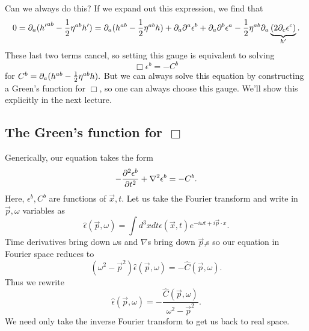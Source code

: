Can we always do this? If we expand out this expression, we find that
$$0=\partial_a({h'}^{ab}-\frac{1}{2}\eta^{ab}h')=\partial_a(h^{ab}-\frac{1}{2}\eta^{ab}h)+\partial_a \partial^a \epsilon^b +\partial_a \partial^b \epsilon^a -\frac{1}{2} \eta^{ab} \partial_a \underbrace{(2\partial_c \epsilon^c)}_{h'}.$$
These last two terms cancel, so setting this gauge is equivalent to solving
$$\Box \epsilon^b = -C^b$$ for
$C^b=\partial_a(h^{ab}-\frac{1}{2}\eta^{ab}h).$
But we can always solve this equation by constructing a Green's function for $\Box$, so one can always choose this gauge. We'll show this explicitly in the next lecture.

\subsection*{The Green's function for $\Box$} Generically, our equation takes the form
$$-\frac{\partial^2 \epsilon^b}{\partial t^2}+\nabla^2 \epsilon^b =-C^b.$$
Here, $\epsilon^b, C^b$ are functions of $\vec x,t$. Let us take the Fourier transform and write in $\vec p,\omega$ variables as
$$\hat \epsilon(\vec p,\omega)=\int d^3x dt \epsilon(\vec x,t) e^{-i\omega t +i\vec p \cdot x}.$$
Time derivatives bring down $\omega$s and $\nabla$s bring down $\vec p$,s so our equation in Fourier space reduces to
$$(\omega^2-\vec p^2) \hat \epsilon(\vec p, \omega)=-\hat C(\vec p, \omega).$$
Thus we rewrite
$$\hat \epsilon(\vec p, \omega)=-\frac{\hat C(\vec p,\omega)}{\omega^2-\vec p^2}.$$
We need only take the inverse Fourier transform to get us back to real space.